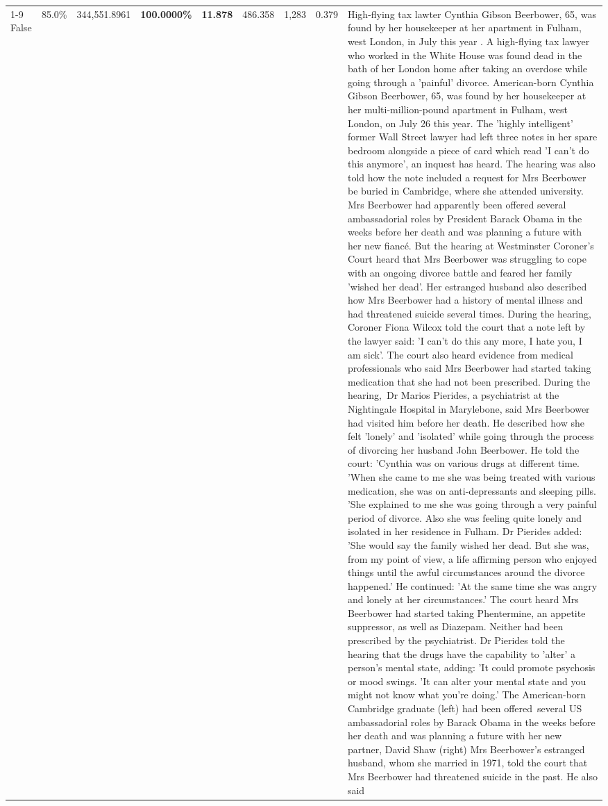 \begin{table}[H]
\begin{tabular}{lllrlllll}
\cline{1-9}
False & 85.0\% & 344,551.8961 & \bfseries \color{red} 100.0000\% & \bfseries \color{red} 11.878 & 486.358 & 1,283 & 0.379 & High-flying tax lawter Cynthia Gibson Beerbower, 65, was found by her housekeeper at her apartment in Fulham, west London, in July this year . A high-flying tax lawyer who worked in the White House was found dead in the bath of her London home after taking an overdose while going through a 'painful' divorce. American-born Cynthia Gibson Beerbower, 65, was found by her housekeeper at her multi-million-pound apartment in Fulham, west London, on July 26 this year. The 'highly intelligent' former Wall Street lawyer had left three notes in her spare bedroom alongside a piece of card which read 'I can't do this anymore', an inquest has heard. The hearing was also told how the note included a request for Mrs Beerbower be buried in Cambridge, where she attended university. Mrs Beerbower had apparently been offered several ambassadorial roles by President Barack Obama in the weeks before her death and was planning a future with her new fiancé. But the hearing at Westminster Coroner's Court heard that Mrs Beerbower was struggling to cope with an ongoing divorce battle and feared her family 'wished her dead'. Her estranged husband also described how Mrs Beerbower had a history of mental illness and had threatened suicide several times. During the hearing, Coroner Fiona Wilcox told the court that a note left by the lawyer said: 'I can't do this any more, I hate you, I am sick'. The court also heard evidence from medical professionals who said Mrs Beerbower had started taking medication that she had not been prescribed. During the hearing, Dr Marios Pierides, a psychiatrist at the Nightingale Hospital in Marylebone, said Mrs Beerbower had visited him before her death. He described how she felt 'lonely' and 'isolated' while going through the process of divorcing her husband John Beerbower. He told the court: 'Cynthia was on various drugs at different time. 'When she came to me she was being treated with various medication, she was on anti-depressants and sleeping pills. 'She explained to me she was going through a very painful period of divorce. Also she was feeling quite lonely and isolated in her residence in Fulham. Dr Pierides added: 'She would say the family wished her dead. But she was, from my point of view, a life affirming person who enjoyed things until the awful circumstances around the divorce happened.' He continued: 'At the same time she was angry and lonely at her circumstances.' The court heard Mrs Beerbower had started taking Phentermine, an appetite suppressor, as well as Diazepam. Neither had been prescribed by the psychiatrist. Dr Pierides told the hearing that the drugs have the capability to 'alter' a person's mental state, adding: 'It could promote psychosis or mood swings. 'It can alter your mental state and you might not know what you're doing.' The American-born Cambridge graduate (left) had been offered several US ambassadorial roles by Barack Obama in the weeks before her death and was planning a future with her new partner, David Shaw (right) Mrs Beerbower's estranged husband, whom she married in 1971, told the court that Mrs Beerbower had threatened suicide in the past. He also said 
\end{tabular}
\end{table}
